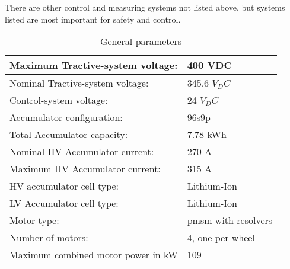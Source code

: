 There are other control and measuring systems not listed above, but systems listed are most important for safety and control.


\begin{table}[H]
	\centering
	\caption{General parameters}
	\begin{tabularx}{\textwidth}{|X|X|}
		\hline
		Maximum Tractive-system voltage: & 400 VDC  \\[\TableSize]
		\hline Nominal Tractive-system voltage: & 345.6 $V_DC$\\[\TableSize]
		\hline
		Control-system voltage: & 24 $V_DC$ \\[\TableSize]
		\hline
		Accumulator configuration: & 96s9p \\[\TableSize]
		\hline
		Total Accumulator capacity: & 7.78 kWh\\[\TableSize]
		\hline
		Nominal HV Accumulator current: & 270 A \\[\TableSize]
		\hline
		Maximum HV Accumulator current: & 315 A \\[\TableSize]
		\hline
		HV accumulator cell type: & Lithium-Ion  \\[\TableSize]
		\hline
		LV Accumulator cell type: & Lithium-Ion \\[\TableSize]
		\hline
		Motor type: & \gls{pmsm} with resolvers \\[\TableSize]
		\hline
		Number of motors: &  4, one per wheel \\[\TableSize]
		\hline
		Maximum combined motor power in kW & 109 \\[\TableSize]
		\hline
	\end{tabularx}%
	\label{tab:system-general}%
\end{table}%
